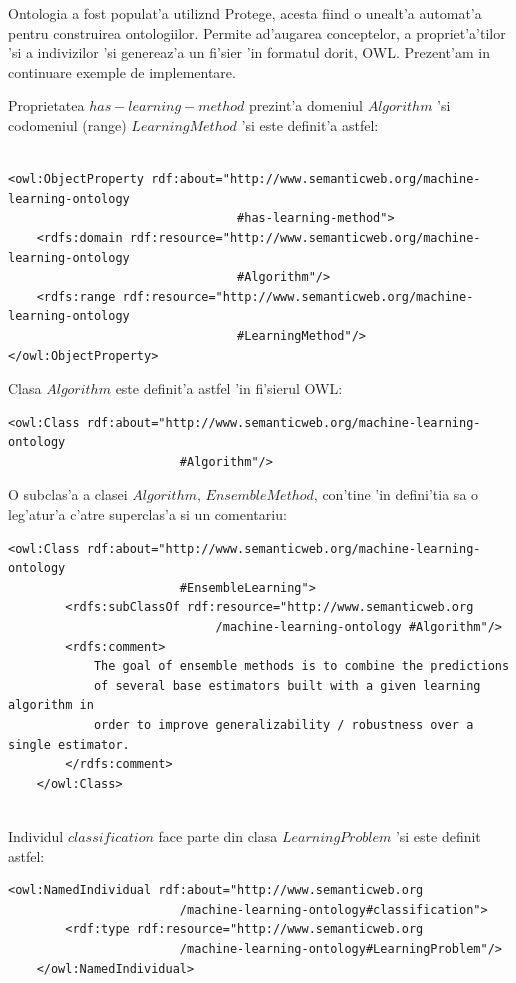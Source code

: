 \documentclass[12pt,a4paper,twoside]{report}
\begin{document}
Ontologia a fost populat'a utiliz\ia nd Protege, acesta fiind o unealt'a automat'a pentru construirea ontologiilor. Permite ad'augarea conceptelor, a propriet'a'tilor 'si a indivizilor 'si genereaz'a un fi'sier 'in formatul dorit, OWL. Prezent'am in continuare exemple de implementare.

Proprietatea $has-learning-method$ prezint'a domeniul $Algorithm$ 'si codomeniul (range) $LearningMethod$ 'si este definit'a astfel:
\begin{lstlisting}[basicstyle=\footnotesize]

<owl:ObjectProperty rdf:about="http://www.semanticweb.org/machine-learning-ontology
                                #has-learning-method">
    <rdfs:domain rdf:resource="http://www.semanticweb.org/machine-learning-ontology
                                #Algorithm"/>
    <rdfs:range rdf:resource="http://www.semanticweb.org/machine-learning-ontology
                                #LearningMethod"/>
</owl:ObjectProperty>
\end{lstlisting}


 Clasa $Algorithm$ este definit'a astfel 'in fi'sierul OWL:
\begin{lstlisting}[basicstyle=\footnotesize]
    <owl:Class rdf:about="http://www.semanticweb.org/machine-learning-ontology
                        #Algorithm"/>
 \end{lstlisting}   

O subclas'a a clasei $Algorithm$, $EnsembleMethod$, con'tine 'in defini'tia sa o leg'atur'a c'atre superclas'a si un comentariu:
\begin{lstlisting}[basicstyle=\footnotesize]
    <owl:Class rdf:about="http://www.semanticweb.org/machine-learning-ontology
                        #EnsembleLearning">
        <rdfs:subClassOf rdf:resource="http://www.semanticweb.org
                             /machine-learning-ontology #Algorithm"/>
        <rdfs:comment>
            The goal of ensemble methods is to combine the predictions
            of several base estimators built with a given learning algorithm in
            order to improve generalizability / robustness over a single estimator.
        </rdfs:comment>
    </owl:Class>
    
\end{lstlisting}
Individul $classification$ face parte din clasa $LearningProblem$ 'si este definit astfel: 

\begin{lstlisting}[basicstyle=\footnotesize]
    <owl:NamedIndividual rdf:about="http://www.semanticweb.org
                        /machine-learning-ontology#classification">
        <rdf:type rdf:resource="http://www.semanticweb.org
                        /machine-learning-ontology#LearningProblem"/>
    </owl:NamedIndividual>
    
\end{lstlisting}
\end{document}
